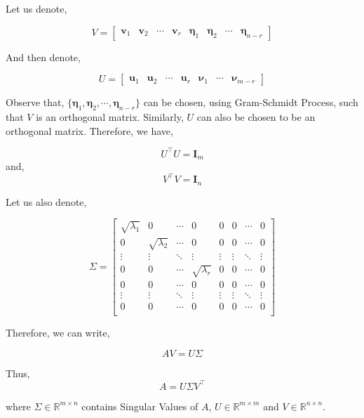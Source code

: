 \documentclass[a4paper]{article}
\begin{document}
Let us denote,

\begin{equation}
V = \begin{bmatrix}
\boldsymbol{v}_1 & \boldsymbol{v}_2 & \cdots & \boldsymbol{v}_r &  \boldsymbol{\eta}_1 & \boldsymbol{\eta}_2 & \cdots & \boldsymbol{\eta}_{n-r}
\end{bmatrix} 
\end{equation}

And then denote,

\begin{equation}
U = \begin{bmatrix}
\boldsymbol{u}_1 & \boldsymbol{u}_2 & \cdots & \boldsymbol{u}_r & \boldsymbol{\nu}_1 & \cdots & \boldsymbol{\nu}_{m-r}
\end{bmatrix}
\end{equation}

Observe that, $\{ \boldsymbol{\eta}_1, \boldsymbol{\eta}_2, \cdots, \boldsymbol{\eta}_{n-r} \}$ can be chosen, using Gram-Schmidt Process, such that $V$ is an orthogonal matrix. Similarly, $U$ can also be chosen to be an orthogonal matrix. Therefore, we have,

\begin{equation}
U^{\top}U = \boldsymbol{I}_m
\end{equation}
and,
\begin{equation}
V^{\top}V = \boldsymbol{I}_n
\end{equation}

Let us also denote,

\begin{equation}
\Sigma = \begin{bmatrix}
\sqrt{\lambda_1} & 0 & \cdots &0 & 0 & 0 & \cdots & 0 \\
0 & \sqrt{\lambda_2} & \cdots & 0 & 0 & 0 & \cdots & 0\\
\vdots & \vdots & \ddots & \vdots & \vdots & \vdots & \ddots & \vdots \\
0 & 0 & \cdots & \sqrt{\lambda_r} & 0 & 0 & \cdots & 0 \\
0 & 0 & \cdots & 0 & 0 & 0 & \cdots & 0 \\
\vdots & \vdots & \ddots & \vdots & \vdots & \vdots & \ddots & \vdots \\
0 & 0 & \cdots & 0 & 0 & 0 & \cdots & 0 \\
\end{bmatrix}
\end{equation}

Therefore, we can write,

\begin{equation}
AV = U\Sigma 
\end{equation}

Thus,
\begin{equation}
A = U\Sigma V^{\top} 
\end{equation}

where $\Sigma \in \mathbb{R}^{m \times n}$ contains Singular Values of $A$, $U \in \mathbb{R}^{m \times m}$ and $V \in \mathbb{R}^{n \times n}$. 
\end{document}
